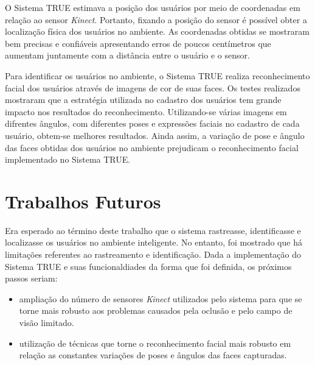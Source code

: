 O Sistema TRUE estimava a posição dos usuários por meio de coordenadas em relação ao sensor \textit{Kinect}. Portanto, fixando a posição do sensor é possível obter a localização física dos usuários no ambiente. As coordenadas obtidas se mostraram bem precisas e confiáveis apresentando erros de poucos centímetros que aumentam juntamente com a distância entre o usuário e o sensor. 

Para identificar os usuários no ambiente, o Sistema TRUE realiza reconhecimento facial dos usuários através de imagens de cor de suas faces. Os testes realizados mostraram que a estratégia utilizada no cadastro dos usuários tem grande impacto nos resultados do reconhecimento. Utilizando-se várias imagens em difrentes ângulos, com diferentes poses e expressões faciais no cadastro de cada usuário, obtem-se melhores resultados. Ainda assim, a variação de pose e ângulo das faces obtidas dos usuários no ambiente prejudicam o reconhecimento facial implementado no Sistema TRUE.

\section{Trabalhos Futuros}

Era esperado ao término deste trabalho que o sistema rastreasse, identificasse e localizasse os usuários no ambiente inteligente. No entanto, foi mostrado que há limitações referentes ao rastreamento e identificação. Dada a implementação do Sistema TRUE e suas funcionaldiades da forma que foi definida, os próximos passos seriam:

\begin{itemize}
	\item ampliação do número de sensores \textit{Kinect} utilizados pelo sistema para que se torne mais robusto aos problemas causados pela oclusão e pelo campo de visão limitado.
	\item utilização de técnicas que torne o reconhecimento facial mais robusto em relação as constantes variações de poses e ângulos das faces capturadas.
\end{itemize}




